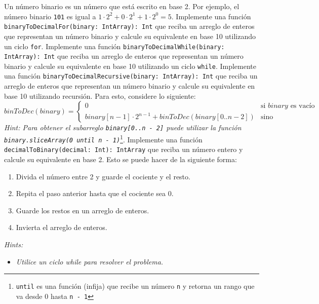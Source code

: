   \begin{Exercise}[title={Números binarios}]
    Un número binario es un número que está escrito en base 2.
    Por ejemplo, el número binario \texttt{101} es igual a \(1 \cdot 2^2 + 0 \cdot 2^1 + 1 \cdot 2^0 
    = 5\).
    \Question Implemente una función \texttt{binaryToDecimalFor(binary: IntArray): Int} que reciba un 
      arreglo de enteros que representan un número binario y calcule su equivalente en base 10 
      utilizando un ciclo \texttt{for}.
    \Question Implemente una función \texttt{binaryToDecimalWhile(binary: IntArray): Int} que reciba 
      un arreglo de enteros que representan un número binario y calcule su equivalente en base 10
      utilizando un ciclo \texttt{while}.
    \Question Implemente una función \texttt{binaryToDecimalRecursive(binary: IntArray): Int} que 
      reciba un arreglo de enteros que representan un número binario y calcule su equivalente en base 
      10 utilizando recursión.
      Para esto, considere lo siguiente:
      \[
        \mathit{binToDec(binary)} = \begin{cases}
          0 & \text{si } \mathit{binary} \text{ es vacío} \\
          \mathit{binary}[n - 1] \cdot 2^{n - 1} + \mathit{binToDec}(\mathit{binary[0..n - 2]}) 
            & \text{sino}
        \end{cases}
      \]
      \textit{Hint: Para obtener el subarreglo \texttt{binary[0..n - 2]} puede utilizar la función
      \texttt{binary.sliceArray(0 until n - 1)}}\footnote{\texttt{until} es una función (infija) que 
      recibe un número \texttt{n} y retorna un rango que va desde 0 hasta \texttt{n - 1}}.
    \Question Implemente una función \texttt{decimalToBinary(decimal: Int): IntArray} que reciba un 
      número entero y calcule su equivalente en base 2.
      Esto se puede hacer de la siguiente forma:
      \begin{enumerate}
        \item Divida el número entre 2 y guarde el cociente y el resto.
        \item Repita el paso anterior hasta que el cociente sea 0.
        \item Guarde los restos en un arreglo de enteros.
        \item Invierta el arreglo de enteros.
      \end{enumerate}
      \textit{Hints:}
      \begin{itemize}
        \item \textit{Utilice un ciclo \textit{while} para resolver el problema.}

\end{itemize}
\end{Exercise}

